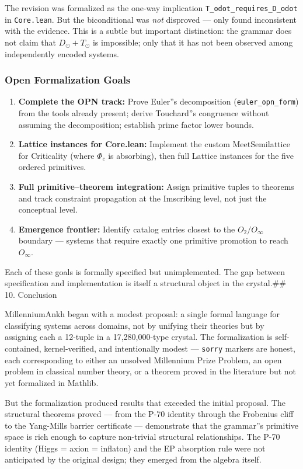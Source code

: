 \documentclass[12pt,a4paper]{article}
\begin{document}
The revision was formalized as the one-way implication \texttt{T\_odot\_requires\_D\_odot} in \texttt{Core.lean}. But the biconditional was \emph{not} disproved --- only found inconsistent with the evidence. This is a subtle but important distinction: the grammar does not claim that $D_{\odot} + T_{\odot}$ is impossible; only that it has not been observed among independently encoded systems.

\subsubsection{Open Formalization Goals}

\begin{enumerate}
    \item \textbf{Complete the OPN track:} Prove Euler''s decomposition (\texttt{euler\_opn\_form}) from the tools already present; derive Touchard''s congruence without assuming the decomposition; establish prime factor lower bounds.
    \item \textbf{Lattice instances for Core.lean:} Implement the custom MeetSemilattice for Criticality (where $\Phi_c$ is absorbing), then full Lattice instances for the five ordered primitives.
    \item \textbf{Full primitive--theorem integration:} Assign primitive tuples to theorems and track constraint propagation at the Imscribing level, not just the conceptual level.
    \item \textbf{Emergence frontier:} Identify catalog entries closest to the $O_2 / O_{\infty}$ boundary --- systems that require exactly one primitive promotion to reach $O_{\infty}$.
\end{enumerate}

Each of these goals is formally specified but unimplemented. The gap between specification and implementation is itself a structural object in the crystal.\#\# 10. Conclusion

MillenniumAnkh began with a modest proposal: a single formal language for classifying systems across domains, not by unifying their theories but by assigning each a 12-tuple in a 17,280,000-type crystal. The formalization is self-contained, kernel-verified, and intentionally modest --- \texttt{sorry} markers are honest, each corresponding to either an unsolved Millennium Prize Problem, an open problem in classical number theory, or a theorem proved in the literature but not yet formalized in Mathlib.

But the formalization produced results that exceeded the initial proposal. The structural theorems proved --- from the P-70 identity through the Frobenius cliff to the Yang-Mills barrier certificate --- demonstrate that the grammar''s primitive space is rich enough to capture non-trivial structural relationships. The P-70 identity (Higgs = axion = inflaton) and the EP absorption rule were not anticipated by the original design; they emerged from the algebra itself.
\end{document}
